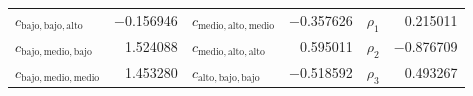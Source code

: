 \begin{table}[!t]
\begin{tabular}{@{}lrlrlr@{}}
$c_{\text{bajo},\text{bajo},\text{alto}}$ & $-$0.156946 & $c_{\text{medio},\text{alto},\text{medio}}$ & $-$0.357626 & $\rho_{1}$ & 0.215011 \\
$c_{\text{bajo},\text{medio},\text{bajo}}$ & 1.524088 & $c_{\text{medio},\text{alto},\text{alto}}$ & 0.595011 & $\rho_{2}$ & $-$0.876709 \\
$c_{\text{bajo},\text{medio},\text{medio}}$ & 1.453280 & $c_{\text{alto},\text{bajo},\text{bajo}}$ & $-$0.518592 & $\rho_{3}$ & 0.493267 \\
\bottomrule
\end{tabular}
\end{table}
